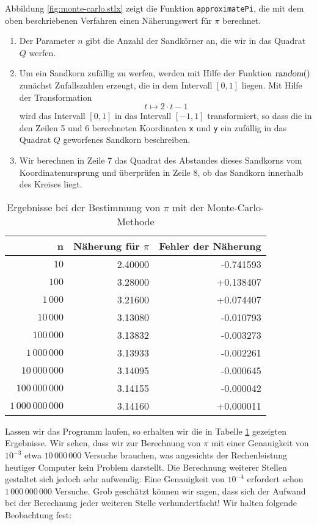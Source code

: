 Abbildung \ref{fig:monte-carlo.stlx} zeigt die Funktion \texttt{approximatePi}, die mit dem oben
beschriebenen Verfahren einen N\"aherungswert f\"ur $\pi$ berechnet.
\begin{enumerate}
\item Der Parameter $n$ gibt die Anzahl der Sandk\"orner an, die wir in das Quadrat $Q$ werfen.
\item Um ein Sandkorn zuf\"allig zu werfen, werden mit Hilfe der Funktion $\textsl{random}()$ 
      zun\"achst Zufalls\-zahlen erzeugt, die in dem
      Intervall $[0,1]$ liegen.  Mit Hilfe der Transformation 
      \[ t \mapsto 2 \cdot t - 1  \]
      wird das Intervall $[0,1]$ in das Intervall $[-1, 1]$ transformiert, so dass die in den Zeilen 5 und 6
      berechneten Koordinaten \texttt{x} und \texttt{y} ein zuf\"allig in das Quadrat $Q$ 
      geworfenes Sandkorn beschreiben.
\item Wir berechnen in Zeile 7 das Quadrat des  Abstandes dieses Sandkorns vom
      Koordinatenursprung und \"uberpr\"ufen in Zeile 8, ob das Sandkorn innerhalb des Kreises liegt.
\end{enumerate}

\begin{table}[htbp]
  \label{tab:pi}
  \centering
  \begin{tabular}[t]{|r|r|r|}
  \hline
  n & N\"aherung f\"ur $\pi$ & Fehler der N\"aherung \\
  \hline
  \hline
               $10$ & 2.40000 & -0.741593 \\
\hline
              $100$ & 3.28000 & +0.138407 \\
\hline
           $1\,000$ & 3.21600 & +0.074407 \\
\hline
          $10\,000$ & 3.13080 & -0.010793 \\
\hline
         $100\,000$ & 3.13832 & -0.003273 \\
\hline
      $1\,000\,000$ & 3.13933 & -0.002261 \\
\hline
     $10\,000\,000$ & 3.14095 & -0.000645 \\
\hline
    $100\,000\,000$ & 3.14155 & -0.000042 \\
\hline
 $1\,000\,000\,000$ & 3.14160 & +0.000011 \\
\hline
  \end{tabular}
  \caption{Ergebnisse bei der Bestimmung von $\pi$ mit der Monte-Carlo-Methode}
\end{table}

Lassen wir das Programm laufen, so erhalten wir die in Tabelle \ref{tab:pi} gezeigten Ergebnisse.
Wir sehen, dass wir zur Berechnung von $\pi$ mit einer Genauigkeit von $10^{-3}$ etwa $10\,000\,000$
Versuche brauchen, was angesichts der Rechenleistung heutiger Computer kein Problem darstellt.  Die Berechnung
weiterer Stellen gestaltet sich jedoch sehr aufwendig:  Eine Genauigkeit von $10^{-4}$
erfordert schon $1\,000\,000\,000$ Versuche. Grob gesch\"atzt k\"onnen wir
sagen, dass sich der Aufwand bei der Berechnung jeder weiteren Stelle verhundertfacht!  
Wir halten folgende Beobachtung fest:

